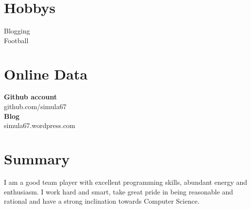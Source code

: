 \documentclass[line,margin]{res}
\begin{document}
\begin{resume}
\section{Hobbys}
Blogging\\
Football\\

\section{Online Data}
{\bf Github account}\\
github.com/simula67\\
{\bf Blog}\\
simula67.wordpress.com

\section{Summary}
I am a good team player with excellent programming skills, abundant energy and enthusiasm. I work hard and smart, take great pride in being reasonable and rational and have a strong inclination towards Computer Science.

\end{resume}
\end{document}
